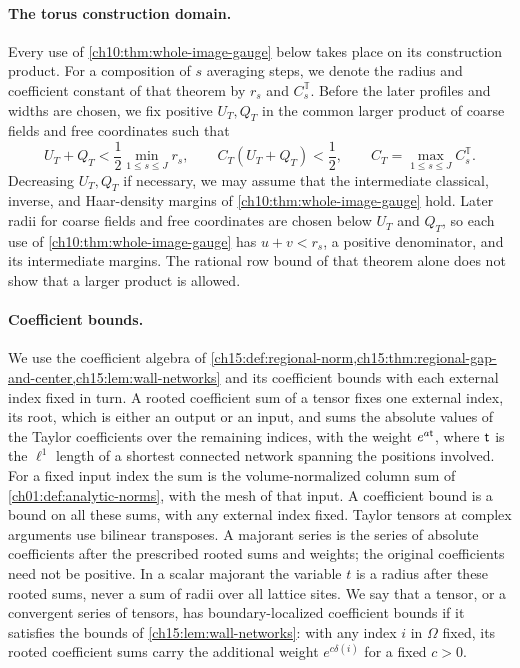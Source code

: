 \paragraph{The torus construction domain.}
Every use of \cref{ch10:thm:whole-image-gauge} below takes place on its construction product. For a composition of $s$ averaging steps, we denote the radius and coefficient constant of that theorem by $r_s$ and $C_s^{\mathbb T}$. Before the later profiles and widths are chosen, we fix positive $U_T,Q_T$ in the common larger product of coarse fields and free coordinates such that
\begin{equation}\label{ch16:eq:torus-reserve}
 U_T+Q_T<\frac12\min_{1\le s\le J}r_s,\qquad
 C_T(U_T+Q_T)<\frac12,
 \qquad C_T=\max_{1\le s\le J}C_s^{\mathbb T}.
\end{equation}
Decreasing $U_T,Q_T$ if necessary, we may assume that the intermediate classical, inverse, and Haar-density margins of \cref{ch10:thm:whole-image-gauge} hold. Later radii for coarse fields and free coordinates are chosen below $U_T$ and $Q_T$, so each use of \cref{ch10:thm:whole-image-gauge} has $u+v<r_s$, a positive denominator, and its intermediate margins. The rational row bound of that theorem alone does not show that a larger product is allowed.

\paragraph{Coefficient bounds.}
We use the coefficient algebra of \cref{ch15:def:regional-norm,ch15:thm:regional-gap-and-center,ch15:lem:wall-networks} and its coefficient bounds with each external index fixed in turn. A rooted coefficient sum of a tensor fixes one external index, its root, which is either an output or an input, and sums the absolute values of the Taylor coefficients over the remaining indices, with the weight $e^{a\mathsf t}$, where $\mathsf t$ is the $\ell^1$ length of a shortest connected network spanning the positions involved. For a fixed input index the sum is the volume-normalized column sum of \cref{ch01:def:analytic-norms}, with the mesh of that input. A coefficient bound is a bound on all these sums, with any external index fixed. Taylor tensors at complex arguments use bilinear transposes. A majorant series is the series of absolute coefficients after the prescribed rooted sums and weights; the original coefficients need not be positive. In a scalar majorant the variable $t$ is a radius after these rooted sums, never a sum of radii over all lattice sites. We say that a tensor, or a convergent series of tensors, has boundary-localized coefficient bounds if it satisfies the bounds of \cref{ch15:lem:wall-networks}: with any index $i$ in $\Omega$ fixed, its rooted coefficient sums carry the additional weight $e^{c\delta(i)}$ for a fixed $c>0$.


